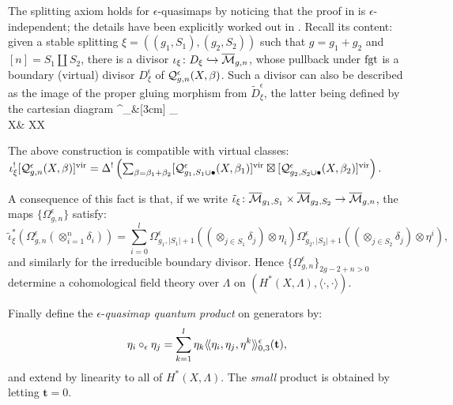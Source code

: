 The splitting axiom holds for $\epsilon$-quasimaps by noticing that the proof in \cite{Behrend} is $\epsilon$-independent; the details have been explicitly worked out in \cite[Appendix B.3]{BN}. Recall its content: given a stable splitting $\xi=((g_1,S_1),(g_2,S_2))$ such that $g=g_1+g_2$ and $[n]=S_1\coprod S_2$, there is a divisor $\iota_\xi\colon D_\xi\hookrightarrow\overline{\mathcal{M}}_{g,n}$, whose pullback under $\operatorname{fgt}$ is a boundary (virtual) divisor $D^\epsilon_\xi$ of $\mathcal{Q}^{\epsilon}_{g,n}(X,\beta)$. Such a divisor can also be described as the image of the proper gluing morphism from $\tilde{D}^\epsilon_\xi$, the latter being defined by the cartesian diagram
\bcd
{}^\epsilon_\xi \ar[d]\ar[r] &[3cm] \coprod_{}\times {} \\
X & X\times X
\ecd

\begin{lem} The above construction is compatible with virtual classes:
 $\iota_\xi^![\mathcal{Q}^{\epsilon}_{g,n}(X,\beta)]^{\mathrm{vir}}=\Delta^!\left(\sum_{\beta=\beta_1+\beta_2}[\mathcal{Q}^{\epsilon}_{g_1,S_1\cup\bullet}(X,\beta_1)]^{\mathrm{vir}}\boxtimes[\mathcal{Q}^{\epsilon}_{g_2,S_2\cup\bullet}(X,\beta_2)]^{\mathrm{vir}}\right).$
\end{lem}

A consequence of this fact is that, if we write $\tilde{\iota}_\xi\colon \overline{\mathcal{M}}_{g_1,S_1}\times \overline{\mathcal{M}}_{g_2,S_2}\rightarrow \overline{\mathcal{M}}_{g,n}$, the maps $\{\Omega^\epsilon_{g,n}\}$ satisfy:
\[\tilde{\iota}_\xi^*(\Omega^\epsilon_{g,n}(\otimes_{i=1}^n\delta_i))=\sum_{i=0}^l\Omega^\epsilon_{g_1,\lvert S_1\rvert+1}((\otimes_{j\in S_1}\delta_j)\otimes \eta_i)\Omega^\epsilon_{g_2,\lvert S_2\rvert+1}((\otimes_{j\in S_2}\delta_j)\otimes \eta^i),\]
and similarly for the irreducible boundary divisor. Hence $\{\Omega^\epsilon_{g,n}\}_{2g-2+n>0}$ determine a cohomological field theory over $\Lambda$ on $(H^*(X,\Lambda),\langle\cdot,\cdot\rangle)$.

Finally define the $\epsilon$-\emph{quasimap quantum product} on generators by:
\[\eta_i\circ_\epsilon \eta_j=\sum_{k=1}^l\eta_k\langle\!\langle\eta_i,\eta_j,\eta^k\rangle\!\rangle^\epsilon_{0,3}(\mathbf{t}),\]
and extend by linearity to all of $H^*(X,\Lambda)$. The \emph{small} product is obtained by letting $\mathbf t=0$.

